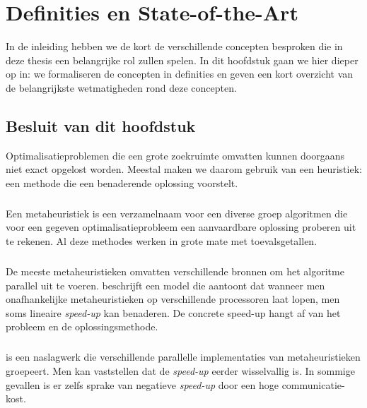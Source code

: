 \chapter{Definities en State-of-the-Art}

In de inleiding hebben we de kort de verschillende concepten besproken die in deze thesis een belangrijke rol zullen spelen. In dit hoofdstuk gaan we hier dieper op in: we formaliseren de concepten in definities en geven een kort overzicht van de belangrijkste wetmatigheden rond deze concepten.












\section{Besluit van dit hoofdstuk}
Optimalisatieproblemen die een grote zoekruimte omvatten kunnen doorgaans niet exact opgelost worden. Meestal maken we daarom gebruik van een heuristiek: een methode die een benaderende oplossing voorstelt.

\paragraph{}
Een metaheuristiek is een verzamelnaam voor een diverse groep algoritmen die voor een gegeven optimalisatieprobleem een aanvaardbare oplossing proberen uit te rekenen. Al deze methodes werken in grote mate met toevalsgetallen.

\paragraph{}
De meeste metaheuristieken omvatten verschillende bronnen om het algoritme parallel uit te voeren. \cite{DBLP:journals/jc/ShonkwilerV94} beschrijft een model die aantoont dat wanneer men onafhankelijke metaheuristieken op verschillende processoren laat lopen, men soms lineaire \emph{speed-up} kan benaderen. De concrete speed-up hangt af van het probleem en de oplossingsmethode.

\paragraph{}
\cite{Alba2005book} is een naslagwerk die verschillende parallelle implementaties van metaheuristieken groepeert. Men kan vaststellen dat de \emph{speed-up} eerder wisselvallig is. In sommige gevallen is er zelfs sprake van negatieve \emph{speed-up} door een hoge communicatie-kost.

